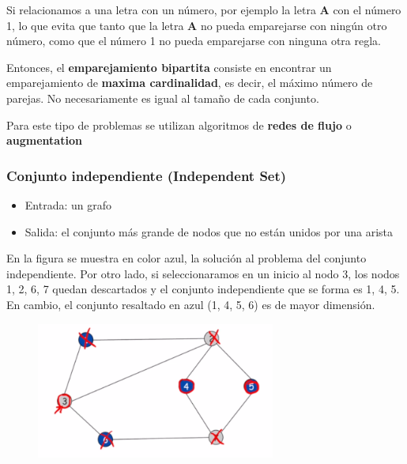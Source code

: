 \documentclass[letterpaper, 12pt]{article}
\begin{document}
Si relacionamos a una letra con un número, por ejemplo la letra \textbf{A} con el
número 1, lo que evita que tanto que la letra \textbf{A} no pueda emparejarse con
ningún otro número, como que el número 1 no pueda emparejarse con ninguna otra
regla.

Entonces, el \textbf{emparejamiento bipartita} consiste en encontrar un emparejamiento
de \textbf{maxima cardinalidad}, es decir, el máximo número de parejas. No
necesariamente es igual al tamaño de cada conjunto.

Para este tipo de problemas se utilizan algoritmos de \textbf{redes de flujo} o
\textbf{augmentation}
\subsubsection{Conjunto independiente (Independent Set)}
\label{sec:org42287b0}
\begin{itemize}
\item Entrada: un grafo
\item Salida: el conjunto más grande de nodos que no están unidos por una arista
\end{itemize}

En la figura se muestra en color azul, la solución al problema del conjunto
independiente. Por otro lado, si seleccionaramos en un inicio al nodo 3, los
nodos 1, 2, 6, 7 quedan descartados y el conjunto independiente que se forma es
1, 4, 5. En cambio, el conjunto resaltado en azul (1, 4, 5, 6) es de mayor
dimensión.

\begin{figure}
    \includegraphics[width=0.7\textwidth, height=0.4\textwidth]
        {./img/independent_set.png}
\end{figure}
\end{document}
